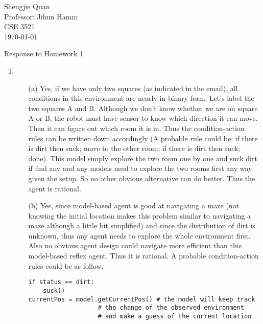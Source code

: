 \documentclass[12pt]{article}
\title{}
\author{}
\date{}                                           %
\begin{document}
\begin{flushleft}
Shengjie Quan\\
Professor: Jihun Hamm\\
CSE 3521	 \\
\today \\
\end{flushleft}

\begin{center}
Response to Homework 1
\end{center}

\setlength{\parindent}{0.5in}

\begin{singlespace}

\begin{enumerate}

\item 
	\begin{itemize}
	\item[(a)] Yes, if we have only two squares (as indicated in the email), all conditions in this environment are nearly in binary form. Let's label the two squares A and B. Although we don't know whether we are on square A or B, the robot must have sensor to know which direction it can move. Then it can figure out which room it is in. Thus the condition-action rules can be written down accordingly (A probable rule could be: if there is dirt then suck; move to the other room; if there is dirt then suck; done). This model simply explore the two room one by one and suck dirt if find any and any models need to explore the two rooms first any way given the setup. So no other obvious alternative can do better. Thus the agent is rational.
	\item[(b)] Yes, since model-based agent is good at navigating a maze (not knowing the initial location makes this problem similar to navigating a maze although a little bit simplified) and since the distribution of dirt is unknown, thus any agent needs to explore the whole environment first. Also no obvious agent design could navigate more efficient than this model-based reflex agent. Thus it is rational. A probable condition-action rules could be as follow.
	\begin{lstlisting}[basicstyle=\ttfamily\scriptsize]
if status == dirt:
	suck()
currentPos = model.getCurrentPos() # the model will keep track
				   # the change of the observed environment
				   # and make a guess of the current location


\end{lstlisting}
\end{itemize}
\end{enumerate}
\end{singlespace}
\end{document}
